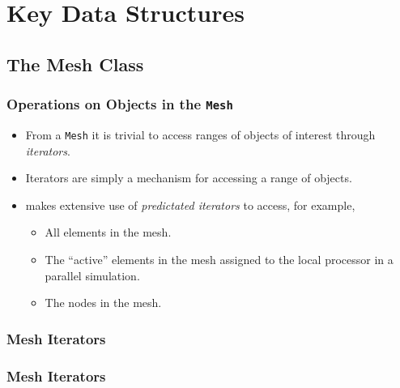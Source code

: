 \section{Key Data Structures}

\subsection{The Mesh Class}

\begin{frame}
  \frametitle{Operations on Objects in the \texttt{Mesh}}
  \begin{block}{}
    \begin{itemize}
    \item From a \texttt{Mesh} it is trivial to access ranges of objects of interest through \emph{iterators}.
    \item Iterators are simply a mechanism for accessing a range of objects.
    \item \libMesh{} makes extensive use of \emph{predictated iterators} to access, for example,
      \begin{itemize}
        \item All elements in the mesh.
        \item The ``active'' elements in the mesh assigned to the local processor in a parallel simulation.
        \item The nodes in the mesh.
      \end{itemize}
  \end{itemize}
  \end{block}
\end{frame}

\begin{frame}[shrink]
  \frametitle{Mesh Iterators}
  
\end{frame}

\begin{frame}[shrink]
  \frametitle{Mesh Iterators}
  
\end{frame}



